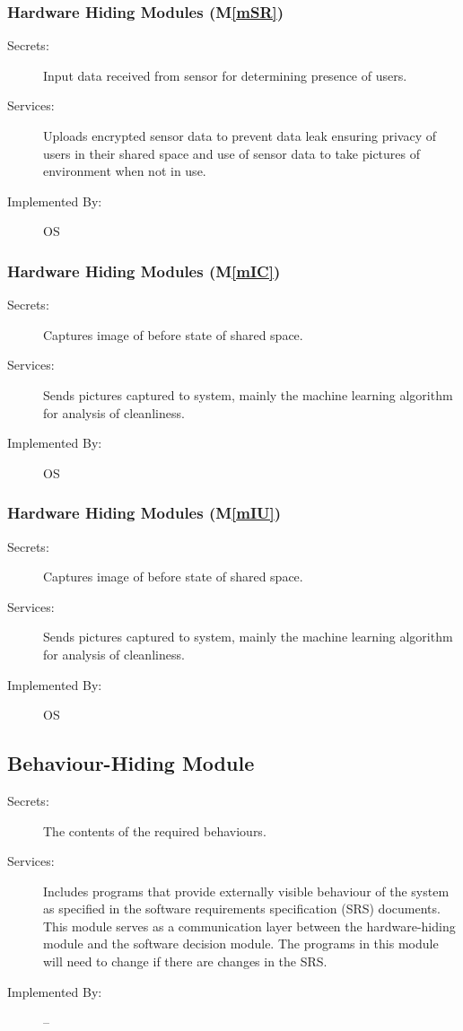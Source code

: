 \documentclass[12pt, titlepage]{article}
\newcommand{\mref}[1]{M\ref{#1}}
\begin{document}
\subsubsection{Hardware Hiding Modules (\mref{mSR})}

\begin{description}
\item[Secrets:]Input data received from sensor for determining presence of users.
\item[Services:]Uploads encrypted sensor data to prevent data leak ensuring privacy of users in their shared space and use of sensor data to take pictures of environment when not in use.
\item[Implemented By:] OS
\end{description}

\subsubsection{Hardware Hiding Modules (\mref{mIC})}

\begin{description}
\item[Secrets:]Captures image of before state of shared space.
\item[Services:]Sends pictures captured to system, mainly the machine learning algorithm for analysis of cleanliness.
\item[Implemented By:] OS
\end{description}

\subsubsection{Hardware Hiding Modules (\mref{mIU})}

\begin{description}
\item[Secrets:]Captures image of before state of shared space.
\item[Services:]Sends pictures captured to system, mainly the machine learning algorithm for analysis of cleanliness.
\item[Implemented By:] OS
\end{description}

\subsection{Behaviour-Hiding Module}

\begin{description}
\item[Secrets:]The contents of the required behaviours.
\item[Services:]Includes programs that provide externally visible behaviour of
  the system as specified in the software requirements specification (SRS)
  documents. This module serves as a communication layer between the
  hardware-hiding module and the software decision module. The programs in this
  module will need to change if there are changes in the SRS.
\item[Implemented By:] --
\end{description}
\end{document}
